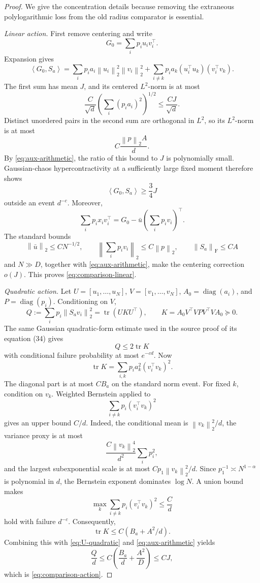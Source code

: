 \documentclass[11pt]{article}
\theoremstyle{remark}
\newcommand{\ip}[2]{\left\langle #1,#2\right\rangle}
\newcommand{\norm}[1]{\left\lVert #1\right\rVert}
\newcommand{\Frob}{\mathrm F}
\begin{document}
\begin{proof}
We give the concentration details because removing the extraneous
polylogarithmic loss from the old radius comparator is essential.

\emph{Linear action.}
First remove centering and write
\[
 G_0=\sum_i p_i u_iv_i^\top.
\]
Expansion gives
\[
 \ip{G_0}{S_a}
 =
 \sum_i p_i a_i\norm{u_i}_2^2\norm{v_i}_2^2
 +\sum_{i\neq k}p_i a_k
 (u_i^\top u_k)(v_i^\top v_k).
\]
The first sum has mean \(J\), and its centered \(L^2\)-norm is at most
\[
 \frac{C}{\sqrt d}
 \left(\sum_i(p_i a_i)^2\right)^{1/2}
 \leq\frac{CJ}{\sqrt d}.
\]
Distinct unordered pairs in the second sum are orthogonal in
\(L^2\), so its \(L^2\)-norm is at most
\[
 C\frac{\norm p_2 A}{d}.
\]
By \eqref{eq:aux-arithmetic}, the ratio of this bound to \(J\) is
polynomially small.  Gaussian-chaos hypercontractivity at a sufficiently
large fixed moment therefore shows
\[
 \ip{G_0}{S_a}\geq\frac34J
\]
outside an event \(d^{-c}\).
Moreover,
\[
 \sum_i p_ix_iv_i^\top
 =G_0-\bar u\left(\sum_i p_iv_i\right)^\top.
\]
The standard bounds
\[
 \norm{\bar u}_2\leq C N^{-1/2},\qquad
 \left\|\sum_i p_iv_i\right\|_2\leq C\norm p_2,\qquad
 \norm{S_a}_{\Frob}\leq CA
\]
and \(N\gg D\), together with \eqref{eq:aux-arithmetic}, make the
centering correction \(o(J)\).  This proves
\eqref{eq:comparison-linear}.

\emph{Quadratic action.}
Let \(U=[u_1,\ldots,u_N]\), \(V=[v_1,\ldots,v_N]\),
\(A_0=\operatorname{diag}(a_i)\), and \(P=\operatorname{diag}(p_i)\).
Conditioning on \(V\),
\[
 Q:=\sum_i p_i\norm{S_av_i}_2^2
 =\operatorname{tr}(UKU^\top),
 \qquad
 K=A_0V^\top VPV^\top VA_0\succeq0.
\]
The same Gaussian quadratic-form estimate used in the source proof of
its equation (34) gives
\begin{equation}
 Q\leq2\operatorname{tr}K
 \label{eq:U-quadratic}
\end{equation}
with conditional failure probability at most \(e^{-cd}\).
Now
\[
 \operatorname{tr}K
 =\sum_{i,k}p_i a_k^2(v_i^\top v_k)^2.
\]
The diagonal part is at most \(CB_a\) on the standard norm event.
For fixed \(k\), condition on \(v_k\).  Weighted Bernstein applied to
\[
 \sum_{i\neq k}p_i(v_i^\top v_k)^2
\]
gives an upper bound \(C/d\).  Indeed, the conditional mean is
\(\norm{v_k}_2^2/d\), the variance proxy is at most
\[
 \frac{C\norm{v_k}_2^4}{d^2}\sum_i p_i^2,
\]
and the largest subexponential scale is at most
\(Cp_1\norm{v_k}_2^2/d\).
Since \(p_1^{-1}\asymp N^{1-\alpha}\) is polynomial in \(d\), the
Bernstein exponent dominates \(\log N\).  A union bound makes
\[
 \max_k\sum_{i\neq k}p_i(v_i^\top v_k)^2\leq\frac Cd
 \label{eq:leave-one-out}
\]
hold with failure \(d^{-c}\).  Consequently,
\[
 \operatorname{tr}K\leq C(B_a+A^2/d).
\]
Combining this with \eqref{eq:U-quadratic} and
\eqref{eq:aux-arithmetic} yields
\[
 \frac Qd
 \leq C\left(\frac{B_a}{d}+\frac{A^2}{D}\right)
 \leq CJ,
\]
which is \eqref{eq:comparison-action}.


\end{proof}
\end{document}
